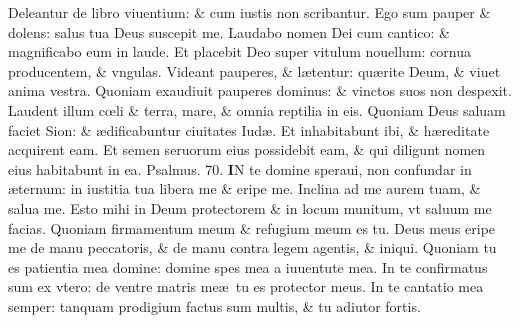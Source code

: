 \documentclass[a5paper,10pt]{book}
\def\ae{æ}
\def\oe{œ}
\begin{document}
\begin{multicols*}{2}
\newline \color{red} D\color{black}eleantur de libro viuentium: \& cum iustis non scribantur.
\newline \color{red} E\color{black}go sum pauper \& dolens: salus tua Deus suscepit me.
\newline \color{red} L\color{black}audabo nomen Dei cum cantico: \& magnificabo eum in laude.
\newline \color{red} E\color{black}t placebit Deo super vitulum nouellum: cornua producentem, \& vngulas.
\newline \color{red} V\color{black}ideant pauperes, \& l\ae tentur: qu\ae rite Deum, \& viuet anima vestra.
\newline \color{red} Q\color{black}uoniam exaudiuit pauperes dominus: \& vinctos suos non despexit.
\newline \color{red} L\color{black}audent illum c\oe li \& terra, mare, \& omnia reptilia in eis.
\newline \color{red} Q\color{black}uoniam Deus saluam faciet Sion: \& \ae dificabuntur ciuitates Iud\ae .
\newline \color{red} E\color{black}t inhabitabunt ibi, \& h\ae reditate acquirent eam.
\newline \color{red} E\color{black}t semen seruorum eius possidebit eam, \& qui diligunt nomen eius habitabunt in ea. \quad \color{red} Psalmus. \hypertarget{ps70}{70.} \color{black}
\vspace{-1em}
\lettrine[lines=2]{\bfseries \color{red} I}{}N te domine speraui, non confundar in \ae ternum: in iustitia tua libera me \& eripe me.
\newline \color{red} I\color{black}nclina ad me aurem tuam, \& salua me.
\newline \color{red} E\color{black}sto mihi in Deum protectorem \& in locum munitum, vt saluum me facias.
\newline \color{red} Q\color{black}uoniam firmamentum meum \& refugium meum es tu.
\newline \color{red} D\color{black}eus meus eripe me de manu peccatoris, \& de manu contra legem agentis, \& iniqui.
\newline \color{red} Q\color{black}uoniam tu es patientia mea domine: domine spes mea a iuuentute mea.
\newline \color{red} I\color{black}n te confirmatus sum ex vtero: de ventre matris me\ae \ tu es protector meus.
\newline \color{red} I\color{black}n te cantatio mea semper: tanquam prodigium factus sum multis, \& tu adiutor fortis.

\end{multicols*}
\end{document}
